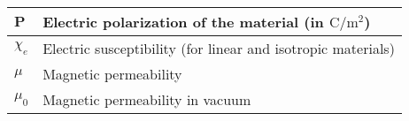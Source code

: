 \begin{xltabular}{\textwidth}{XX}
	\(\mathbf{P}\)                                                                                                                  & Electric polarization of the material (in \(\si{\coulomb\per\meter\squared}\))                                                                                                           \\ \hline
	\(\chi_e\)                                                                                                                      & Electric susceptibility (for linear and isotropic materials)                                                                                                                             \\ \hline
	\(\mu\)                                                                                                                         & Magnetic permeability                                                                                                                                                                    \\ \hline
	\(\mu_0\)                                                                                                                       & Magnetic permeability in vacuum                                                                                                                                                          \\
\end{xltabular}